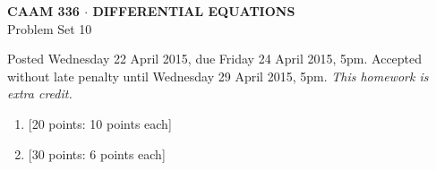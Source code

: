\documentclass[10pt]{article}
\begin{document}
\begin{center}
\large \textsf{\textbf{CAAM 336 $\cdot$ DIFFERENTIAL EQUATIONS}\\[0.5em]
 Problem Set 10 }
\end{center}

Posted Wednesday 22 April 2015, due Friday 24 April 2015, 5pm.  Accepted without late penalty until Wednesday 29 April 2015, 5pm.  \emph{This homework is extra credit.}

\begin{enumerate}
%

\item {[20 points: 10 points each]}\\  
\newpage
\item {[30 points: 6 points each]}\\  



\end{enumerate}
\end{document}
